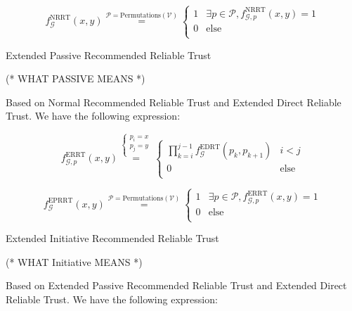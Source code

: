 \documentclass{article}
\begin{document}
\begin{equation}
f_{\mathcal{G}}^{\text{NRRT}}(x,y)\overset{\mathcal{P}=\text{Permutations}(\mathcal{V})}{=}\left\{
\begin{array}{cc}
 1 & \exists \mathit{p}\in \mathcal{P},f_{\mathcal{G},\mathit{p}}^{\text{NRRT}}(x,y)=1 \\
 0 & \text{else} \\
\end{array}
\right.
\end{equation}

Extended Passive Recommended Reliable Trust

(* WHAT PASSIVE MEANS *)

Based on Normal Recommended Reliable Trust and Extended Direct Reliable Trust. We have the following expression:

\begin{equation}
f_{\mathcal{G},\mathit{p}}^{\text{ERRT}}(x,y)\overset{\left\{
\begin{array}{c}
 \mathit{p}_i=x \\
 \mathit{p}_j=y \\
\end{array}
\right.}{=}\left\{
\begin{array}{cc}
 \prod _{k=i}^{j-1} f_{\mathcal{G}}^{\text{EDRT}}\left(\mathit{p}_k,p_{k+1}\right) & i<j \\
 0 & \text{else} \\
\end{array}
\right.
\end{equation}

\begin{equation}
f_{\mathcal{G}}^{\text{EPRRT}}(x,y)\overset{\mathcal{P}=\text{Permutations}(\mathcal{V})}{=}\left\{
\begin{array}{cc}
 1 & \exists \mathit{p}\in \mathcal{P},f_{\mathcal{G},\mathit{p}}^{\text{ERRT}}(x,y)=1 \\
 0 & \text{else} \\
\end{array}
\right.
\end{equation}

Extended Initiative Recommended Reliable Trust

(* WHAT Initiative MEANS *)

Based on Extended Passive Recommended Reliable Trust and Extended Direct Reliable Trust. We have the following expression:
\end{document}
